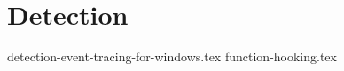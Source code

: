 \documentclass{report}
\begin{document}
\chapter{Detection}
\label{cha:detection}
{detection-event-tracing-for-windows.tex}
{function-hooking.tex}
\end{document}
